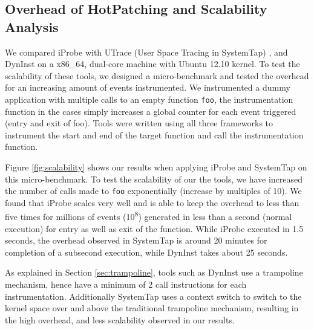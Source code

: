 \subsection{Overhead of HotPatching and Scalability Analysis}

We compared iProbe with UTrace (User Space Tracing in SystemTap) \cite{utrace}, and DynInst \cite{dyninst} on a x86\_64, dual-core machine with Ubuntu 12.10 kernel. 
To test the scalability of these tools, we designed a micro-benchmark and tested the overhead for an increasing amount of events instrumented. 
We instrumented a dummy application with multiple calls to an empty function \texttt{foo}, the instrumentation function in the cases simply increases a global counter for each event triggered (entry and exit of foo). 
Tools were written using all three frameworks to instrument the start and end of the target function and call the instrumentation function. 

Figure \ref{fig:scalability} shows our results when applying iProbe and SystemTap on this micro-benchmark. 
To test the scalability of our the tools, we have increased the number of calls made to \texttt{foo} exponentially (increase by multiples of 10). 
We found that iProbe scales very well and is able to keep the overhead to less than five times for millions of events (10\textsuperscript{8}) generated in less than a second (normal execution) for entry as well as exit of the function. 
While iProbe executed in 1.5 seconds, the overhead observed in SystemTap is around 20 minutes for completion of a subsecond execution, while DynInst takes about 25 seconds. 

As explained in Section \ref{sec:trampoline}, tools such as DynInst use a trampoline mechanism, hence have a minimum of 2 call instructions for each instrumentation.
Additionally SystemTap uses a context switch to switch to the kernel space over and above the traditional trampoline mechanism, resulting in the high overhead, and less scalability observed in our results.

